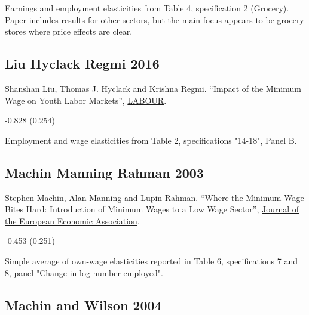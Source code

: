 \vspace{0.7em}

 Earnings and employment elasticities from Table 4, specification 2 (Grocery). Paper includes results for other sectors, but the main focus appears to be grocery stores where price effects are clear.

\subsection*{Liu Hyclack Regmi 2016}
\vspace{-0.7em}

\noindent Shanshan Liu, Thomas J. Hyclack and Krishna Regmi. ``Impact of the Minimum Wage on Youth Labor Markets'', \href{https://doi.org/10.1111/labr.12071}{LABOUR}.

\vspace{0.7em}

 -0.828 (0.254)

\vspace{0.7em}

 Employment and wage elasticities from Table 2, specifications "14-18", Panel B.

\subsection*{Machin Manning Rahman 2003}
\vspace{-0.7em}

\noindent Stephen Machin, Alan Manning and Lupin Rahman. ``Where the Minimum Wage Bites Hard: Introduction of Minimum Wages to a Low Wage Sector'', \href{https://doi.org/10.1162/154247603322256792}{Journal of the European Economic Association}.

\vspace{0.7em}

 -0.453 (0.251)

\vspace{0.7em}

 Simple average of own-wage elasticities reported in Table 6, specifications 7 and 8, panel "Change in log number employed".

\subsection*{Machin and Wilson 2004}
\vspace{-0.7em}

